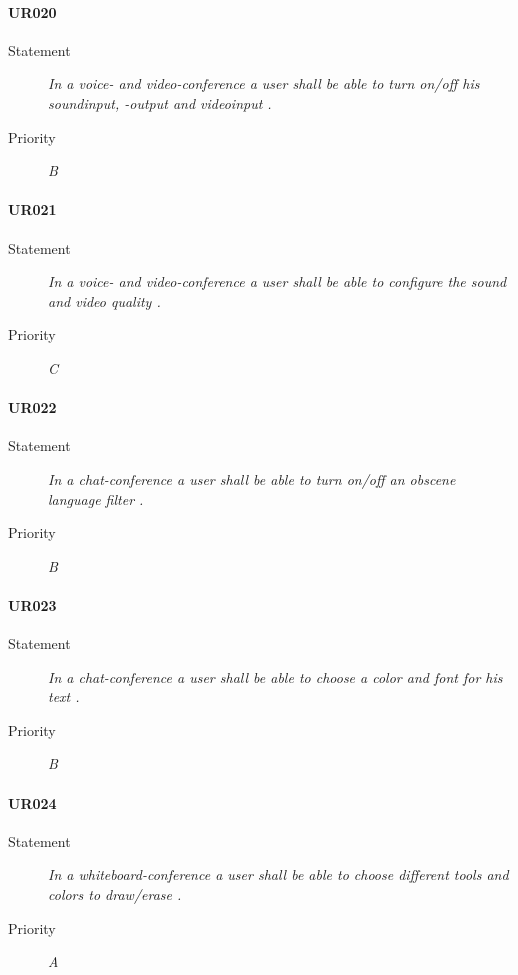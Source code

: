 \paragraph{UR020}
  \begin{description}
  \item [Statement] 
    \textit{ In a voice- and video-conference a user shall be able to turn on/off his soundinput, -output and videoinput
    .}
  \item [Priority] \textit{B}
\end{description}
    
\paragraph{UR021}
  \begin{description}
  \item [Statement] 
    \textit{ In a voice- and video-conference a user shall be able to configure the sound and video quality
    .}
  \item [Priority] \textit{C}
\end{description}
    
\paragraph{UR022}
  \begin{description}
  \item [Statement] 
    \textit{ In a chat-conference a user shall be able to turn on/off an obscene language filter 
    .}
  \item [Priority] \textit{B}
\end{description}
    
\paragraph{UR023}
  \begin{description}
  \item [Statement] 
    \textit{ In a chat-conference a user shall be able to choose a color and font for his text
    .}
  \item [Priority] \textit{B}
\end{description} 
    
\paragraph{UR024}
  \begin{description}
  \item [Statement] 
    \textit{ In a whiteboard-conference a user shall be able to choose different tools and colors to draw/erase
    .}
  \item [Priority] \textit{A}
\end{description}
    
